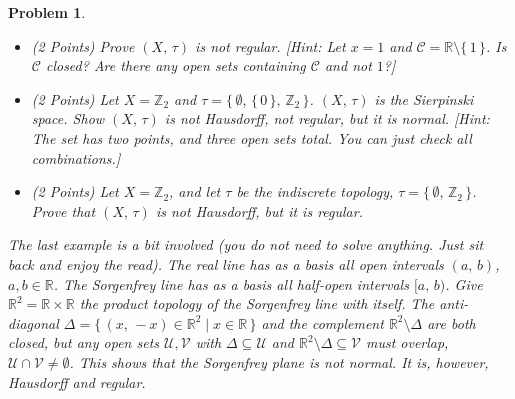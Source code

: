 \documentclass{article}
\theoremstyle{normal}
\newtheorem{problem}{Problem}
\begin{document}
\begin{problem}
\begin{itemize}
                $\tau$ to be all sets $\mathcal{U}\subseteq\mathbb{R}$ such
                that either $\mathcal{U}=\mathbb{R}$ or
                $0\notin\mathcal{U}$. This is the
                \textit{excluded point topology}. Prove $(X,\,\tau)$ is
                normal. [Hint: What do closed sets look like in this space?
                what do \textit{disjoint} closed sets $\mathcal{C}$ and
                $\mathcal{D}$ look like?]
            \item (2 Points) Prove $(X,\,\tau)$ is not regular.
                [Hint: Let $x=1$ and
                $\mathcal{C}=\mathbb{R}\setminus\{\,1\,\}$.
                Is $\mathcal{C}$ closed? Are there any open sets containing
                $\mathcal{C}$ and not $1$?]
            \item (2 Points) Let $X=\mathbb{Z}_{2}$ and
                $\tau=\big\{\,\emptyset,\,\{\,0\,\},\,\mathbb{Z}_{2}\,\big\}$.
                $(X,\,\tau)$ is the \textit{Sierpinski space}. Show
                $(X,\,\tau)$ is not Hausdorff, not regular, but it is
                normal. [Hint: The set has two points, and three open sets
                total. You can just check all combinations.]
            \item (2 Points)
                Let $X=\mathbb{Z}_{2}$, and let $\tau$ be the indiscrete
                topology, $\tau=\{\,\emptyset,\,\mathbb{Z}_{2}\,\}$. Prove
                that $(X,\,\tau)$ is not Hausdorff, but it is regular.
        \end{itemize}
        The last example is a bit involved (you do not need to solve anything.
        Just sit back and enjoy the read). The real line has as a basis all
        open intervals $(a,\,b)$, $a,b\in\mathbb{R}$. The
        \textit{Sorgenfrey line} has as a basis all half-open intervals
        $[a,\,b)$. Give $\mathbb{R}^{2}=\mathbb{R}\times\mathbb{R}$ the product
        topology of the Sorgenfrey line with itself. The anti-diagonal
        $\Delta=\{\,(x,\,-x)\in\mathbb{R}^{2}\;|\;x\in\mathbb{R}\,\}$ and the
        complement $\mathbb{R}^{2}\setminus\Delta$ are both closed, but any
        open sets $\mathcal{U},\mathcal{V}$ with $\Delta\subseteq\mathcal{U}$
        and $\mathbb{R}^{2}\setminus\Delta\subseteq\mathcal{V}$ must overlap,
        $\mathcal{U}\cap\mathcal{V}\ne\emptyset$. This shows that the Sorgenfrey
        plane is \textit{not} normal. It is, however, Hausdorff and regular. 
    \end{problem}
\end{document}
